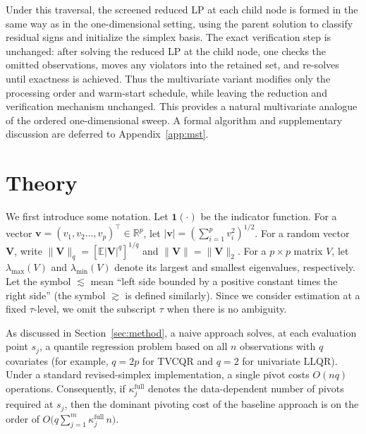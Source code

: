 \documentclass[lineno]{biometrika}
\begin{document}
Under this traversal, the screened reduced LP at each child node is formed in the same way as in the one-dimensional
setting, using the parent solution to classify residual signs and initialize the simplex basis. The exact verification
step is unchanged: after solving the reduced LP at the child node, one checks the omitted observations, moves any
violators into the retained set, and re-solves until exactness is achieved. Thus the multivariate variant modifies only
the processing order and warm-start schedule, while leaving the reduction and verification mechanism unchanged. This
provides a natural multivariate analogue of the ordered one-dimensional sweep. A formal algorithm and supplementary
discussion are deferred to Appendix~\ref{app:mst}.

\section{Theory}\label{sec:theory}

We first introduce some notation. Let $\mathbf{1}(\cdot)$ be the indicator function. For a vector
$\mathbf{v}=(v_1,v_2\ldots,v_p)^\top\in\mathbb{R}^p$, let $|\mathbf{v}|=(\sum_{i=1}^pv_i^2)^{1/2}$. For a random
vector $\mathbf{V}$, write $\|\mathbf{V}\|_q=[\mathbb{E}|\mathbf{V}|^q]^{1/q}$ and $\|\mathbf{V}\|=\|\mathbf{V}\|_2$.
For a $p\times p$ matrix $V$, let $\lambda_{\max}(V)$ and $\lambda_{\min}(V)$ denote its largest and smallest
eigenvalues, respectively. Let the symbol $\lesssim$ mean ``left side bounded by a positive constant times the right
side'' (the symbol $\gtrsim$ is defined similarly). Since we consider estimation at a fixed $\tau$-level, we omit the
subscript $\tau$ when there is no ambiguity.

As discussed in Section~\ref{sec:method}, a naive approach solves, at each evaluation point $s_j$, a quantile
regression problem based on all $n$ observations with $q$ covariates (for example, $q=2p$ for TVCQR and $q=2$ for
univariate LLQR). Under a standard revised-simplex implementation, a single pivot costs $O(nq)$ operations.
Consequently, if $\kappa^{\mathrm{full}}_j$ denotes the data-dependent number of pivots required at $s_j$, then the
dominant pivoting cost of the baseline approach is on the order of
$O\!\big(q\sum_{j=1}^m \kappa^{\mathrm{full}}_j\,n\big)$.
\end{document}
